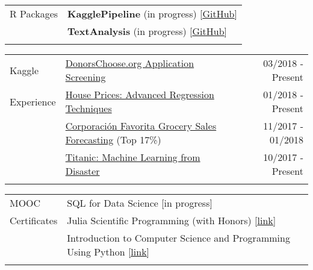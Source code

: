 \documentclass[letterpaper, 11pt]{article}
\begin{document}
\noindent \begin{tabular}{@{} p{3cm} l}
	\Large{R Packages}  & \textbf{KagglePipeline} (in progress) [\href{https://github.com/JiachengHe/KagglePipeline}{\underline{GitHub}}]   \\
    & \textbf{TextAnalysis} (in progress) [\href{https://github.com/JiachengHe/TextAnalysis}{\underline{GitHub}}]   \\
	& \\
\end{tabular}






\noindent \begin{tabular}{@{} p{3cm} p{10.5cm} r}
	\Large{Kaggle}      & \href{https://www.kaggle.com/c/donorschoose-application-screening}{DonorsChoose.org Application Screening} & 03/2018 - Present \\
	\Large{Experience}  & \href{https://www.kaggle.com/c/house-prices-advanced-regression-techniques}{
		House Prices: Advanced Regression Techniques} &  01/2018 - Present \\
	& \href{https://www.kaggle.com/c/favorita-grocery-sales-forecasting}{Corporación Favorita Grocery Sales Forecasting} (Top 17\%) & 11/2017 - 01/2018 \\
	& \href{https://www.kaggle.com/c/titanic}{Titanic: Machine Learning from Disaster} & 10/2017 - Present \\
	& \\
\end{tabular}





\noindent \begin{tabular}{@{} p{3cm} p{15cm} }
	\Large{MOOC}              & SQL for Data Science [in progress] \\
	\Large{Certificates}      & Julia Scientific Programming (with Honors) [\href{https://www.coursera.org/account/accomplishments/certificate/X8AH3BM8MML6}{\underline{link}}]   \\
	& Introduction to Computer Science and Programming Using Python [\href{https://s3.amazonaws.com/verify.edx.org/downloads/7444184db6054c2e8404972c595b5ebf/Certificate.pdf}{\underline{link}}] \\
	\\
\end{tabular}
\end{document}
